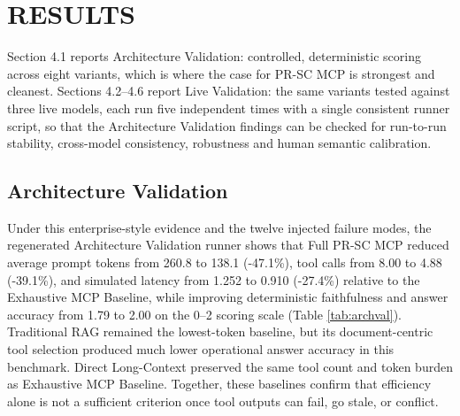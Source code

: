 \section{RESULTS}

Section 4.1 reports Architecture Validation: controlled, deterministic scoring across eight variants, which is where the case for PR-SC MCP is strongest and cleanest. Sections 4.2--4.6 report Live Validation: the same variants tested against three live models, each run five independent times with a single consistent runner script, so that the Architecture Validation findings can be checked for run-to-run stability, cross-model consistency, robustness and human semantic calibration.

\subsection{Architecture Validation}

Under this enterprise-style evidence and the twelve injected failure modes, the regenerated Architecture Validation runner shows that Full PR-SC MCP reduced average prompt tokens from 260.8 to 138.1 (-47.1\%), tool calls from 8.00 to 4.88 (-39.1\%), and simulated latency from 1.252 to 0.910 (-27.4\%) relative to the Exhaustive MCP Baseline, while improving deterministic faithfulness and answer accuracy from 1.79 to 2.00 on the 0--2 scoring scale (Table \ref{tab:archval}). Traditional RAG remained the lowest-token baseline, but its document-centric tool selection produced much lower operational answer accuracy in this benchmark. Direct Long-Context preserved the same tool count and token burden as Exhaustive MCP Baseline. Together, these baselines confirm that efficiency alone is not a sufficient criterion once tool outputs can fail, go stale, or conflict.

